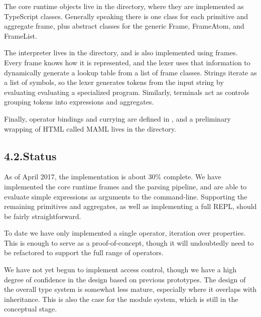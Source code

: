 \documentclass[preprint]{{acmart}}
\begin{document}
\noindent{}The core runtime objects live in the  directory, where they 
are implemented as TypeScript classes.  Generally speaking there is
one class for each primitive and aggregate frame, plus abstract classes for
the generic Frame, FrameAtom, and FrameList.%

The interpreter lives in the  directory, and is also
implemented using frames. Every frame knows how it is represented, and
the lexer uses that information to dynamically generate a lookup table
from a list of frame classes. Strings iterate as a list of symbols, so
the lexer generates tokens from the input string by evaluating
evaluating a specialized program. Similarly, terminals act as controls
grouping tokens into expressions and aggregates.%

Finally, operator bindings and currying are defined in , and a
preliminary wrapping of HTML called MAML lives in the  directory.%

\subsection{4.2.\hspace*{0.5em}Status}\label{sec-status}%

\noindent{}As of April 2017, the implementation is about 30\% complete. We have
implemented the core runtime frames and the parsing pipeline, and are
able to evaluate simple expressions as arguments to the command-line.
Supporting the remaining primitives and aggregates, as well as
implementing a full REPL, should be fairly straightforward.%

To date we have only implemented a single operator, iteration over
properties. This is enough to serve as a proof-of-concept, though it will
undoubtedly need to be refactored to support the full range of operators.%

We have not yet begun to implement access control, though we have a high
degree of confidence in the design based on previous prototypes.  The design
of the overall type system is somewhat less mature, especially where it overlaps
with inheritance. This is also the case for the module system, which is still
in the conceptual stage.%
\end{document}
